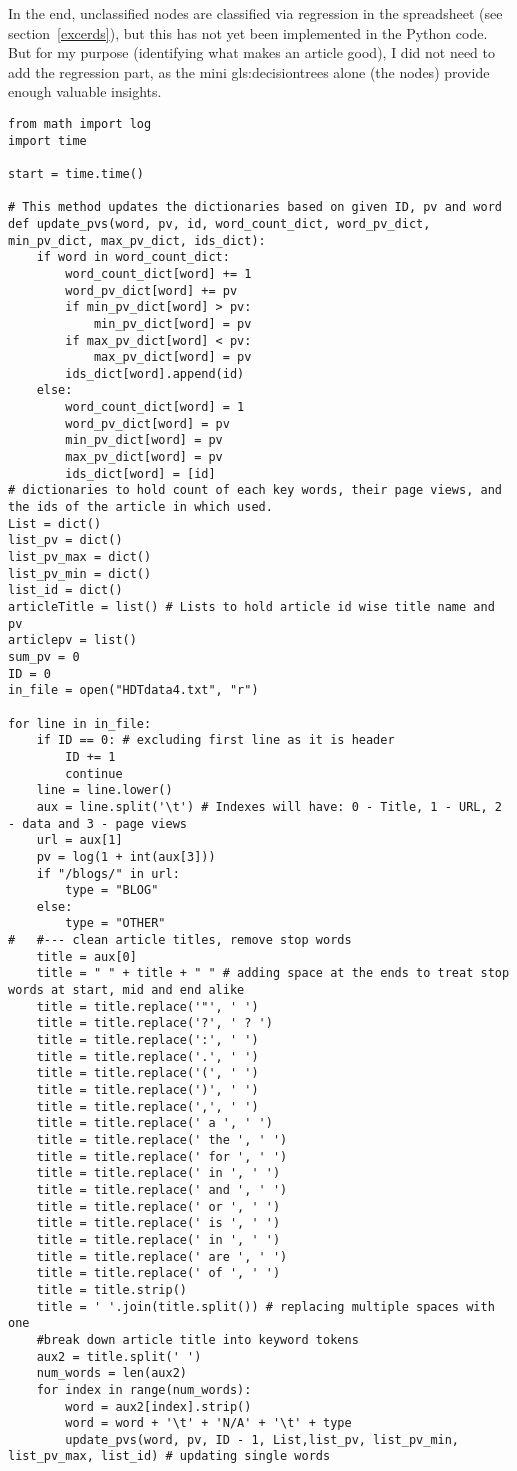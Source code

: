 \documentclass[oneside,10pt]{book}
\begin{document}
In the end, unclassified nodes are classified via regression in the spreadsheet (see section~\ref{excerds}), but this has not yet been implemented in the Python code.
 But for my purpose (identifying what makes an article good), I did not need to add the regression part, as the mini \glspl{gls:decisiontree} alone (the nodes) provide enough valuable insights. \\


\begin{lstlisting}
from math import log
import time

start = time.time()

# This method updates the dictionaries based on given ID, pv and word
def update_pvs(word, pv, id, word_count_dict, word_pv_dict, min_pv_dict, max_pv_dict, ids_dict):
    if word in word_count_dict:
        word_count_dict[word] += 1
        word_pv_dict[word] += pv
        if min_pv_dict[word] > pv:
            min_pv_dict[word] = pv
        if max_pv_dict[word] < pv:
            max_pv_dict[word] = pv
        ids_dict[word].append(id)
    else:
        word_count_dict[word] = 1
        word_pv_dict[word] = pv
        min_pv_dict[word] = pv
        max_pv_dict[word] = pv
        ids_dict[word] = [id]
# dictionaries to hold count of each key words, their page views, and the ids of the article in which used.
List = dict()
list_pv = dict()
list_pv_max = dict()
list_pv_min = dict()
list_id = dict()
articleTitle = list() # Lists to hold article id wise title name and pv
articlepv = list()
sum_pv = 0
ID = 0
in_file = open("HDTdata4.txt", "r")

for line in in_file:
    if ID == 0: # excluding first line as it is header
        ID += 1
        continue
    line = line.lower()
    aux = line.split('\t') # Indexes will have: 0 - Title, 1 - URL, 2 - data and 3 - page views
    url = aux[1]
    pv = log(1 + int(aux[3]))
    if "/blogs/" in url:
        type = "BLOG"
    else:
        type = "OTHER"
#   #--- clean article titles, remove stop words
    title = aux[0]
    title = " " + title + " " # adding space at the ends to treat stop words at start, mid and end alike
    title = title.replace('"', ' ')
    title = title.replace('?', ' ? ')
    title = title.replace(':', ' ')
    title = title.replace('.', ' ')
    title = title.replace('(', ' ')
    title = title.replace(')', ' ')
    title = title.replace(',', ' ')
    title = title.replace(' a ', ' ')
    title = title.replace(' the ', ' ')
    title = title.replace(' for ', ' ')
    title = title.replace(' in ', ' ')
    title = title.replace(' and ', ' ')
    title = title.replace(' or ', ' ')
    title = title.replace(' is ', ' ')
    title = title.replace(' in ', ' ')
    title = title.replace(' are ', ' ')
    title = title.replace(' of ', ' ')
    title = title.strip()
    title = ' '.join(title.split()) # replacing multiple spaces with one
    #break down article title into keyword tokens
    aux2 = title.split(' ')
    num_words = len(aux2)
    for index in range(num_words):
        word = aux2[index].strip()
        word = word + '\t' + 'N/A' + '\t' + type
        update_pvs(word, pv, ID - 1, List,list_pv, list_pv_min, list_pv_max, list_id) # updating single words


\end{lstlisting}
\end{document}

